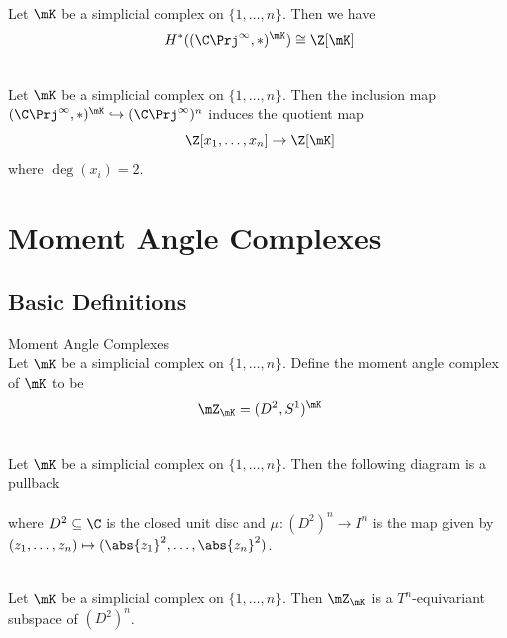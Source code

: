 \documentclass[a4paper]{article}
\begin{document}
\begin{prp}{}{}\\
Let $\mK$ be a simplicial complex on $\{1,\dots,n\}$. Then we have $$H^\ast((\C\Prj^\infty,\ast)^\mK)\cong\Z[\mK]$$
\end{prp}

\begin{prp}{}{}\\
Let $\mK$ be a simplicial complex on $\{1,\dots,n\}$. Then the inclusion map $(\C\Prj^\infty,\ast)^\mK\hookrightarrow(\C\Prj^\infty)^n$ induces the quotient map $$\Z[x_1,\dots,x_n]\to\Z[\mK]$$ where $\deg(x_i)=2$. 
\end{prp}

\pagebreak
\section{Moment Angle Complexes}
\subsection{Basic Definitions}
\begin{defn}{Moment Angle Complexes}{}\\
Let $\mK$ be a simplicial complex on $\{1,\dots,n\}$. Define the moment angle complex of $\mK$ to be $$\mZ_\mK=(D^2,S^1)^\mK$$
\end{defn}

\begin{prp}{}{}\\
Let $\mK$ be a simplicial complex on $\{1,\dots,n\}$. Then the following diagram is a pullback \\
\\
where $D^2\subseteq\C$ is the closed unit disc and $\mu:(D^2)^n\to I^n$ is the map given by $(z_1,\dots,z_n)\mapsto(\abs{z_1}^2,\dots,\abs{z_n}^2)$. 
\end{prp}

\begin{crl}{}{}\\
Let $\mK$ be a simplicial complex on $\{1,\dots,n\}$. Then $\mZ_\mK$ is a $T^n$-equivariant subspace of $(D^2)^n$. 
\end{crl}
\end{document}
